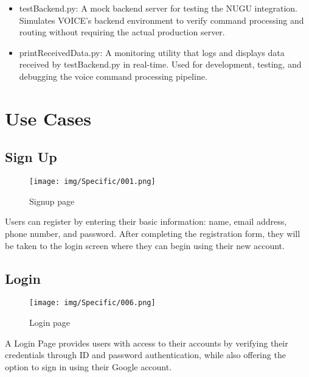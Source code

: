 \documentclass[conference]{IEEEtran}
\begin{document}
\begin{enumerate}[label=\arabic*]
\begin{itemize}[label=-]
        \vspace{0.7em}

        \item testBackend.py: A mock backend server for testing the NUGU integration. Simulates VOICE's backend environment to verify command processing and routing without requiring the actual production server.

        \vspace{0.7em}

        \item printReceivedData.py: A monitoring utility that logs and displays data received by testBackend.py in real-time. Used for development, testing, and debugging the voice command processing pipeline.
    \end{itemize}
\end{enumerate}
    

\vspace{1em} %

\section{Use Cases}

\subsection{Sign Up}
\vspace{0.3em}
\begin{figure}[h]
    \centering
    \texttt{[image: img/Specific/001.png]}
    \caption{Signup page}
\end{figure}
Users can register by entering their basic information: name, email address, phone number, and password. After completing the registration form, they will be taken to the login screen where they can begin using their new account.

\newpage

\subsection{Login}
\vspace{0.3em}
\begin{figure}[h]
    \centering
    \texttt{[image: img/Specific/006.png]}
    \caption{Login page}
\end{figure}
A Login Page provides users with access to their accounts by verifying their credentials through ID and password authentication, while also offering the option to sign in using their Google account.
\end{document}
